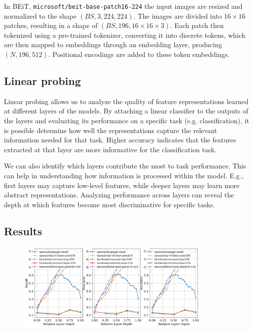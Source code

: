\documentclass[
  11pt,
  a4paper,
  onecolumn]{article}
\begin{document}
In BEiT, \texttt{microsoft/beit-base-patch16-224} the input images are resized and normalized to the shape $(BS, 3, 224, 224)$. The images are divided into $16 \times 16$ patches, resulting in a shape of $(BS, 196, 16 \times 16 \times 3)$. Each patch then tokenized using a pre-trained tokenizer, converting it into discrete tokens, which are then mapped to embeddings through an embedding layer, producing $(N, 196, 512)$. Positional encodings are added to these token embeddings.


\subsection{Linear probing}
Linear probing allows us to analyze the quality of feature representations learned at different layers of the models. By attaching a linear classifier to the outputs of the layers and evaluating its performance on a specific task (e.g. classification), it is possible determine how well the representations capture the relevant information needed for that task. Higher accuracy indicates that the features extracted at that layer are more informative for the classification task.

We can also identify which layers contribute the most to task performance. This can help in understanding how information is processed within the model. E.g., first layers may capture low-level features, while deeper layers may learn more abstract representations. Analyzing performance across layers can reveal the depth at which features become most discriminative for specific tasks.

\subsection{Results}

\begin{figure}[h!] 
\centering
\includegraphics[width=0.85\textwidth]{figures/probing_plots.png}
\end{figure}
\end{document}
